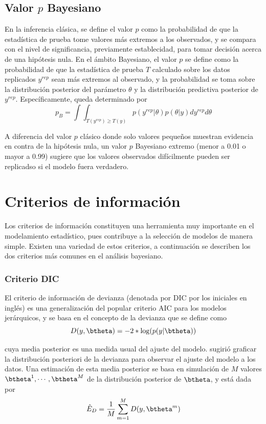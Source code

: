 \subsection{Valor $p$ Bayesiano}
En la inferencia clásica, se define el valor $p$ como la probabilidad de que la estadística de prueba tome valores más extremos a los observados, y se compara con el nivel de significancia, previamente establecidad, para tomar decisión acerca de una hipótesis nula. En el ámbito Bayesiano, el valor $p$ se define como la probabilidad de que la estadística de prueba $T$ calculado sobre los datos replicados $y^{rep}$ sean más extremos al observado, y la probabilidad se toma sobre la distribución posterior del parámetro $\theta$ y la distribución predictiva posterior de $y^{rep}$. Específicamente, queda determinado por
\begin{equation*}
p_B=\int\int_{{T(y^{rep})\geq T(y)}}p(y^{rep}|\theta)p(\theta|y)dy^{rep}d\theta
\end{equation*}

A diferencia del valor $p$ clásico donde solo valores pequeños muestran evidencia en contra de la hipótesis nula, un valor $p$ Bayesiano extremo (menor a 0.01 o mayor a 0.99) sugiere que los valores observados difícilmente pueden ser replicadso si el modelo fuera verdadero.
\section{Criterios de información}

Los criterios de información constituyen una herramienta muy importante en el modelamiento estadístico, pues contribuye a la selección de modelos de manera simple. Existen una variedad de estos criterios, a continuación se describen los dos criterios más comunes en el análisis bayesiano.

\subsubsection*{Criterio DIC}

El criterio de información de devianza (denotada por DIC por los iniciales en inglés) es una generalización del popular criterio AIC para los modelos jerárquicos, y se basa en el concepto de la devianza que se define como
\begin{equation}
D(y, \btheta)=-2*\log(p(y|\btheta))
\end{equation}

cuya media posterior es una medida usual del ajuste del modelo.  sugirió graficar la distribución posteriori de la devianza para observar el ajuste del modelo a los datos. Una estimación de esta media posterior se basa en simulación de $M$ valores $\btheta^1,\cdots,\btheta^M$ de la distribución posterior de $\btheta$, y está dada por
\begin{equation*}
\hat{E}_D=\frac{1}{M}\sum_{m=1}^MD(y,\btheta^m)
\end{equation*}


